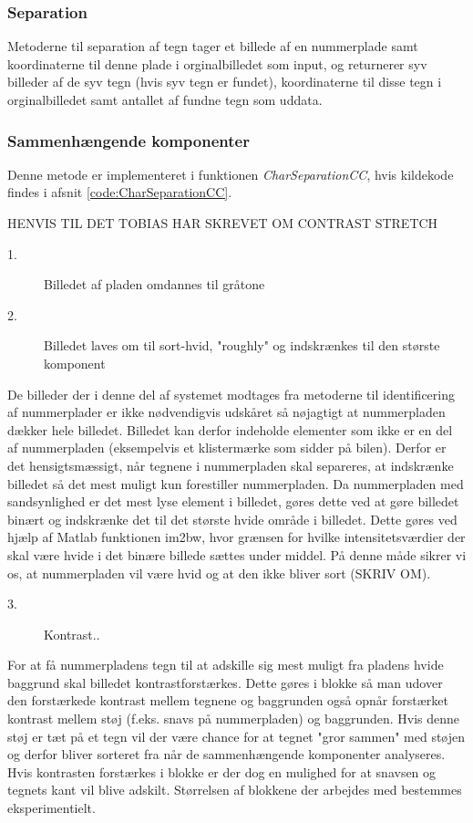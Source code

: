 \subsubsection{Separation}

Metoderne til separation af tegn tager et billede af en nummerplade samt koordinaterne til denne plade i orginalbilledet som input, og returnerer syv billeder af de syv tegn (hvis syv tegn er fundet), koordinaterne til disse tegn i orginalbilledet samt antallet af fundne tegn som uddata.

\subsubsection*{Sammenhængende komponenter}

Denne metode er implementeret i funktionen \textit{CharSeparationCC}, hvis kildekode findes i afsnit \vref{code:CharSeparationCC}.

HENVIS TIL DET TOBIAS HAR SKREVET OM CONTRAST STRETCH

\begin{description}
\item[1.] Billedet af pladen omdannes til gråtone
\item[2.] Billedet laves om til sort-hvid, "roughly" og indskrænkes til den største komponent
\end{description}
De billeder der i denne del af systemet modtages fra metoderne til identificering af nummerplader er ikke nødvendigvis udskåret så nøjagtigt at nummerpladen dækker hele billedet. Billedet kan derfor indeholde elementer som ikke er en del af nummerpladen (eksempelvis et klistermærke som sidder på bilen). Derfor er det hensigtsmæssigt, når tegnene i nummerpladen skal separeres, at indskrænke billedet så det mest muligt kun forestiller nummerpladen. Da nummerpladen med sandsynlighed er det mest lyse element i billedet, gøres dette ved at gøre billedet binært og indskrænke det til det største hvide område i billedet. Dette gøres ved hjælp af Matlab funktionen im2bw, hvor grænsen for hvilke intensitetsværdier der skal være hvide i det binære billede sættes under middel. På denne måde sikrer vi os, at nummerpladen vil være hvid og at den ikke bliver sort (SKRIV OM).

\begin{description}
\item[3.] Kontrast..
\end{description}



For at få nummerpladens tegn til at adskille sig mest muligt fra pladens hvide baggrund skal billedet kontrastforstærkes. Dette gøres i blokke så man udover den forstærkede kontrast mellem tegnene og baggrunden også opnår forstærket kontrast mellem støj (f.eks. snavs på nummerpladen) og baggrunden. Hvis denne støj er tæt på et tegn vil der være chance for at tegnet "gror sammen" med støjen og derfor bliver sorteret fra når de sammenhængende komponenter analyseres. Hvis kontrasten forstærkes i blokke er der dog en mulighed for at snavsen og tegnets kant vil blive adskilt. Størrelsen af blokkene der arbejdes med bestemmes eksperimentielt.

